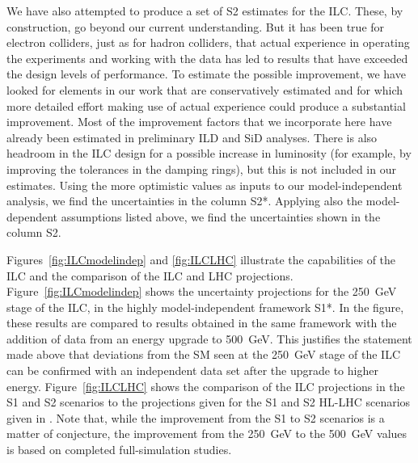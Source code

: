 We have also attempted to produce a set of S2 estimates for the ILC.
These, by construction, go beyond our current understanding.  But it
has been true for electron colliders, just as for hadron colliders,
that actual experience in operating the experiments and working with
the 
data has led  to results that have exceeded the design levels of
performance.  To estimate the possible improvement, 
we have looked for elements in our work that 
are conservatively estimated and for which more detailed effort
making use of actual experience could produce a substantial
improvement.  Most of the improvement factors that we incorporate here
have already been estimated in 
preliminary ILD and SiD analyses.   There is also 
headroom in the ILC design for a possible
increase in luminosity (for example, by improving the tolerances in
the damping rings), but this is not included in our estimates.
  Using the more 
optimistic values as inputs to our 
model-independent analysis, we find the
uncertainties in the column S2*.  Applying also the model-dependent
assumptions
 listed above, we find the uncertainties shown in
 the column S2. 


Figures~\ref{fig:ILCmodelindep} and \ref{fig:ILCLHC}  illustrate the
capabilities of the ILC and the comparison of the ILC and LHC
projections.  Figure~\ref{fig:ILCmodelindep} shows the uncertainty
projections for the 250~GeV stage of the ILC, in the highly
model-independent framework S1*.  In the figure, these results are
compared to results obtained in the same framework with the addition
of data from an energy upgrade to 500~GeV.   This justifies the
statement made above that deviations from the SM seen at the 250~GeV
stage of the ILC can be confirmed with an independent data set after
the upgrade to higher energy.   Figure~\ref{fig:ILCLHC} shows the
comparison of the ILC projections in the S1 and S2 scenarios to the 
projections given for the S1 and S2 HL-LHC scenarios given in
\cite{YR}.  
Note that, while the improvement from the S1 to S2 scenarios is a
matter of conjecture, the improvement from the 250~GeV to the 500~GeV
values is based on completed full-simulation studies.

